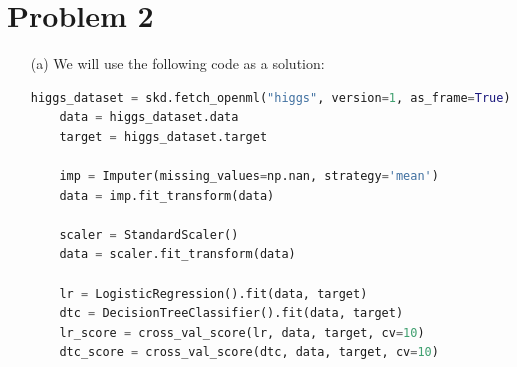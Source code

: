 \documentclass[12pt, letterpaper]{article}
\begin{document}
\section*{Problem 2}
\begin{enumerate}
    \item [(a)] We will use the following code as a solution:
\begin{lstlisting}[language=python]
    higgs_dataset = skd.fetch_openml("higgs", version=1, as_frame=True)
    data = higgs_dataset.data
    target = higgs_dataset.target

    imp = Imputer(missing_values=np.nan, strategy='mean')
    data = imp.fit_transform(data)

    scaler = StandardScaler()
    data = scaler.fit_transform(data)

    lr = LogisticRegression().fit(data, target)
    dtc = DecisionTreeClassifier().fit(data, target)
    lr_score = cross_val_score(lr, data, target, cv=10)
    dtc_score = cross_val_score(dtc, data, target, cv=10)


\end{lstlisting}
\end{enumerate}
\end{document}
